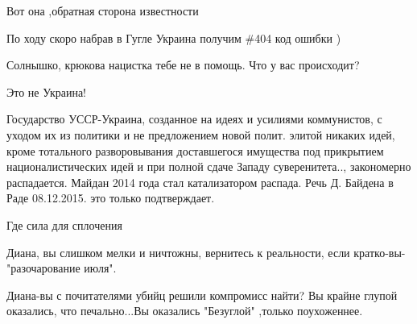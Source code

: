 \begin{itemize}
Вот она ,обратная сторона известности


По ходу скоро набрав в Гугле Украина получим \#404 код ошибки )

 
Солнышко, крюкова нацистка тебе не в помощь. Что у вас происходит?

 
Это не Украина!


Государство УССР-Украина, созданное на идеях и усилиями коммунистов, с уходом
их из политики и не предложением новой полит. элитой никаких идей, кроме
тотального разворовывания доставшегося имущества под прикрытием
националистических идей и при полной сдаче Западу суверенитета.., закономерно
распадается. Майдан 2014 года стал катализатором распада. Речь Д. Байдена в Раде
08.12.2015. это только подтверждает.


Где сила для сплочения

 
Диана, вы слишком мелки и ничтожны, вернитесь к реальности, если кратко-вы-"разочарование июля".

 
Диана-вы с почитателями убийц решили компромисс найти? Вы крайне глупой оказались, что печально...Вы оказались "Безуглой" ,только поухоженнее.

 

\end{itemize}
